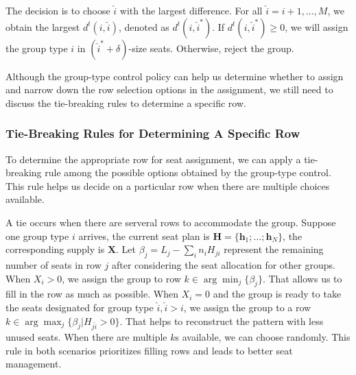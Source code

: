 The decision is to choose $\hat{i}$ with the largest difference. For all $\hat{i} = {i}+1, \ldots, M$, we obtain the largest $d^{t}({i},\hat{i})$, denoted as $d^{t}({i},\hat{i}^{*})$. If $d^{t}({i},\hat{i}^{*}) \geq 0$, we will assign the group type ${i}$ in $(\hat{i}^{*}+\delta)$-size seats. Otherwise, reject the group.

Although the group-type control policy can help us determine whether to assign and narrow down the row selection options in the assignment, we still need to discuss the tie-breaking rules to determine a specific row.

\subsubsection{Tie-Breaking Rules for Determining A Specific Row}\label{tie-break}
To determine the appropriate row for seat assignment, we can apply a tie-breaking rule among the possible options obtained by the group-type control. This rule helps us decide on a particular row when there are multiple choices available.

A tie occurs when there are serveral rows to accommodate the group. Suppose one group type ${i}$ arrives, the current seat plan is $\bm{H} = \{\bm{h}_{1}; \ldots; \bm{h}_{N}\}$, the corresponding supply is $\bm{X}$. Let $\beta_{j} = L_j - \sum_{i} n_{i} H_{ji}$ represent the remaining number of seats in row $j$ after considering the seat allocation for other groups. When $X_{i} > 0$, we assign the group to row $k \in \arg \min_{j} \{\beta_{j}\}$. That allows us to fill in the row as much as possible. When $X_{i} = 0$ and the group is ready to take the seats designated for group type $\hat{i}, \hat{i}>i$, we assign the group to a row $k \in \arg \max_{j} \{\beta_{j}| H_{j \hat{i}}>0\}$. That helps to reconstruct the pattern with less unused seats. When there are multiple $k$s available, we can choose randomly. This rule in both scenarios prioritizes filling rows and leads to better seat management.


